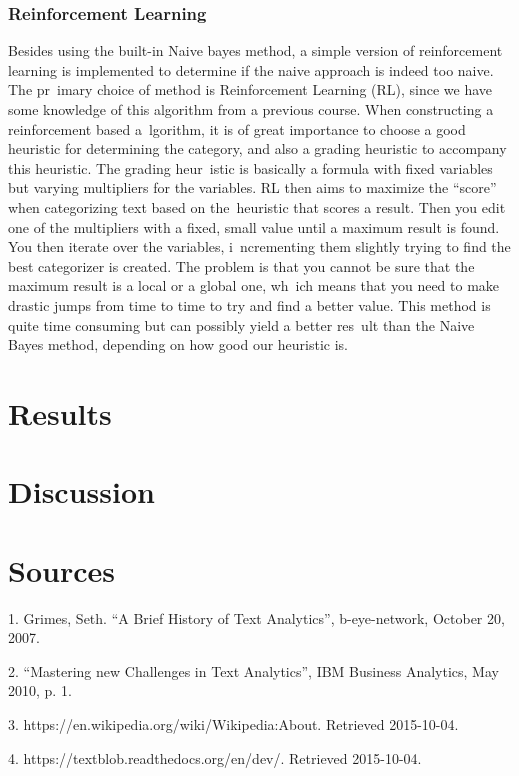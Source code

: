 \documentclass[a4paper]{article}
\begin{document}
\subsubsection{Reinforcement Learning}
Besides using the built-in Naive bayes method, a simple version of reinforcement learning is implemented to determine if the naive approach is indeed too naive. The pr\
imary choice of method is Reinforcement Learning (RL), since we have some knowledge of this algorithm from a previous course. When constructing a reinforcement based a\
lgorithm, it is of great importance to choose a good heuristic for determining the category, and also a grading heuristic to accompany this heuristic. The grading heur\
istic is basically a formula with fixed variables but varying multipliers for the variables. RL then aims to maximize the ``score'' when categorizing text based on the\
 heuristic that scores a result. Then you edit one of the multipliers with a fixed, small value until a maximum result is found. You then iterate over the variables, i\
ncrementing them slightly trying to find the best categorizer is created. The problem is that you cannot be sure that the maximum result is a local or a global one, wh\
ich means that you need to make drastic jumps from time to time to try and find a better value. This method is quite time consuming but can possibly yield a better res\
ult than the Naive Bayes method, depending on how good our heuristic is.

\section*{Results}

\section*{Discussion}


\section*{Sources}


1. Grimes, Seth. “A Brief History of Text Analytics”, b-eye-network, October 20, 2007.

2. “Mastering new Challenges in Text Analytics”, IBM Business Analytics, May 2010, p. 1.

3. https://en.wikipedia.org/wiki/Wikipedia:About. Retrieved 2015-10-04.

4. https://textblob.readthedocs.org/en/dev/. Retrieved 2015-10-04.
\end{document}
